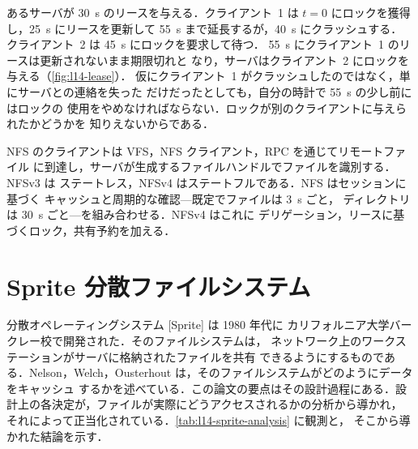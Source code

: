 \documentclass[../main.tex]{subfiles}
\begin{document}
\begin{example}
  あるサーバが \SI{30}{\second} のリースを与える．クライアント~1 は
  $t=0$ にロックを獲得し，\SI{25}{\second} にリースを更新して
  \SI{55}{\second} まで延長するが，\SI{40}{\second} にクラッシュする．
  クライアント~2 は \SI{45}{\second} にロックを要求して待つ．
  \SI{55}{\second} にクライアント~1 のリースは更新されないまま期限切れと
  なり，サーバはクライアント~2 にロックを与える（\cref{fig:l14-lease}）．
  仮にクライアント~1 がクラッシュしたのではなく，単にサーバとの連絡を失った
  だけだったとしても，自分の時計で \SI{55}{\second} の少し前にはロックの
  使用をやめなければならない．ロックが別のクライアントに与えられたかどうかを
  知りえないからである．
\end{example}

\begin{keypoint}
  NFS のクライアントは VFS，NFS クライアント，RPC を通じてリモートファイル
  に到達し，サーバが生成するファイルハンドルでファイルを識別する．NFSv3 は
  ステートレス，NFSv4 はステートフルである．NFS はセッションに基づく
  キャッシュと周期的な確認---既定でファイルは \SI{3}{\second} ごと，
  ディレクトリは \SI{30}{\second} ごと---を組み合わせる．NFSv4 はこれに
  デリゲーション，リースに基づくロック，共有予約を加える．
\end{keypoint}

\section{Sprite 分散ファイルシステム}
\label{sec:l14-sprite}

分散オペレーティングシステム [Sprite] は 1980 年代に
カリフォルニア大学バークレー校で開発された．そのファイルシステムは，
ネットワーク上のワークステーションがサーバに格納されたファイルを共有
できるようにするものである．Nelson，Welch，Ousterhout
\cite{nelson1988} は，そのファイルシステムがどのようにデータをキャッシュ
するかを述べている．この論文の要点はその設計過程にある．設計上の各決定が，ファイルが実際にどうアクセスされるかの分析から導かれ，
それによって正当化されている．\cref{tab:l14-sprite-analysis} に観測と，
そこから導かれた結論を示す．
\end{document}
